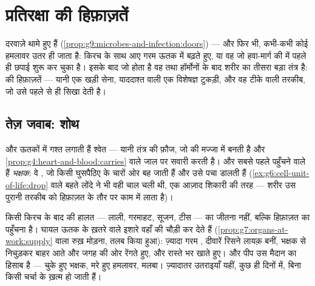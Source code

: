\chapter{प्रतिरक्षा की हिफ़ाज़तें}\label{ch:g9:immune-defenses}

दरवाज़े थामे हुए हैं (\cref{prop:g9:microbes-and-infection:doors}) ---
और फिर भी, कभी-कभी कोई हमलावर उतर ही जाता है: किरच के साथ आए  गरम
ऊतक में बढ़ते हुए, या वह  जो हवा-मार्ग की  में पहले ही
छपाई शुरू कर चुका है। इसके बाद जो होता है वह  तथा हॉर्मोनों के
बाद शरीर का तीसरा बड़ा तंत्र है:  की हिफ़ाज़तें --- यानी एक
खड़ी सेना, याददाश्त वाली एक विशेषज्ञ टुकड़ी, और वह टीके वाली तरकीब, जो उसे
पहले से ही सिखा देती है।

\section{तेज़ जवाब: शोथ}

\begin{definition}[खड़ी सेना]\label{def:g9:immune-defenses:standing}
 और ऊतकों में गश्त लगाती हैं श्वेत 
 --- यानी  तंत्र की फ़ौज, जो
 की मज्जा में बनती है और
\cref{prop:g4:heart-and-blood:carries} वाले जाल पर सवारी करती है। और
सबसे पहले पहुँचने वाले हैं \emph{भक्षक}: वे , जो किसी घुसपैठिए के
चारों ओर बह जाती हैं और उसे पचा डालती हैं
(\cref{ex:g6:cell-unit-of-life:drop} वाले बहते लोंदे ने भी वही चाल चली
थी, एक आज़ाद शिकारी की तरह --- शरीर उस पुरानी तरकीब को हिफ़ाज़त के तौर पर
काम में लाता है)।
\end{definition}

\begin{proposition}[शोथ, ठीक से पढ़ा हुआ]\label{prop:g9:immune-defenses:inflammation}
किसी किरच के बाद की हालत --- लाली, गरमाहट, सूजन, टीस ---  का
जीतना नहीं, बल्कि हिफ़ाज़त का पहुँचना है। घायल ऊतक के ख़तरे वाले इशारे
वहाँ की  चौड़ी कर देते हैं
(\cref{prop:g7:organs-at-work:supply} वाला रुख़ मोड़ना, तलब किया हुआ):
ज़्यादा गरम , दीवारें रिसने लायक़ बनीं, भक्षक  से निचुड़कर
बाहर आते और जगह की ओर रेंगते हुए, और रास्ते भर  खाते हुए। और पीप उस
मैदान का हिसाब है --- चुके हुए भक्षक, मरे हुए हमलावर, मलबा। ज़्यादातर
उतराइयाँ यहीं, कुछ ही दिनों में, बिना किसी चर्चा के ख़त्म हो जाती हैं।
\end{proposition}
\admitted

